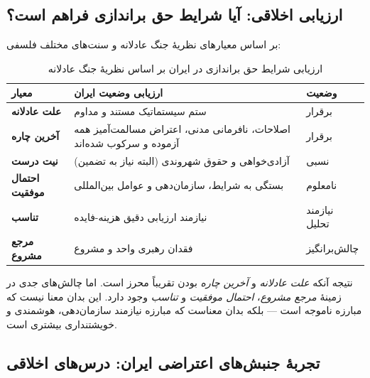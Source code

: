 \subsection{ارزیابی اخلاقی: آیا شرایط حق براندازی فراهم است؟}

بر اساس معیارهای نظریهٔ جنگ عادلانه و سنت‌های مختلف فلسفی:

\begin{table}[htbp]
\centering
\small
\begin{tabularx}{\linewidth}{|>{\raggedleft\bfseries}p{3.5cm}|X|>{\centering\arraybackslash}p{2cm}|}
\hline
\rowcolor{BgCool}
\textbf{معیار} & \textbf{ارزیابی وضعیت ایران} & \textbf{وضعیت} \\
\hline
علت عادلانه & ستم سیستماتیک مستند و مداوم & \cellcolor{green!15} برقرار \\
\hline
آخرین چاره & اصلاحات، نافرمانی مدنی، اعتراض مسالمت‌آمیز همه آزموده و 
سرکوب شده‌اند & \cellcolor{green!15} برقرار \\
\hline
نیت درست & آزادی‌خواهی و حقوق شهروندی (البته نیاز به تضمین) & 
\cellcolor{yellow!25} نسبی \\
\hline
احتمال موفقیت & بستگی به شرایط، سازمان‌دهی و عوامل بین‌المللی & 
\cellcolor{yellow!25} نامعلوم \\
\hline
تناسب & نیازمند ارزیابی دقیق هزینه-فایده & \cellcolor{yellow!25} نیازمند 
تحلیل \\
\hline
مرجع مشروع & فقدان رهبری واحد و مشروع & \cellcolor{red!15} چالش‌برانگیز \\
\hline
\end{tabularx}
\caption*{ارزیابی شرایط حق براندازی در ایران بر اساس نظریهٔ جنگ عادلانه}
\end{table}

نتیجه آنکه \textit{علت عادلانه} و \textit{آخرین چاره} بودن تقریباً محرز 
است. اما چالش‌های جدی در زمینهٔ \textit{مرجع مشروع}، \textit{احتمال موفقیت} 
و \textit{تناسب} وجود دارد. این بدان معنا نیست که مبارزه ناموجه است — بلکه 
بدان معناست که مبارزه نیازمند سازمان‌دهی، هوشمندی و خویشتنداری بیشتری است.

\subsection{تجربهٔ جنبش‌های اعتراضی ایران: درس‌های اخلاقی}

